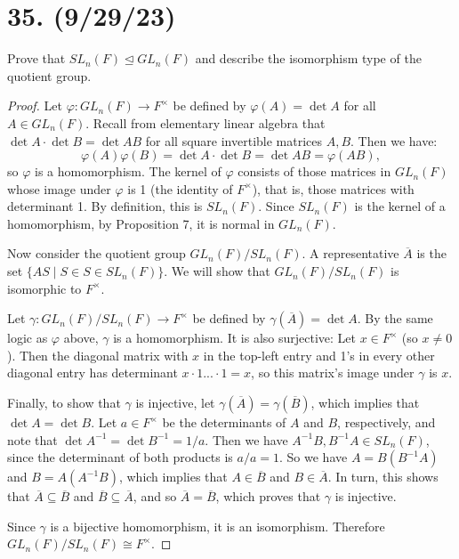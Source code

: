 \documentclass{article}
\begin{document}
\section*{35. (9/29/23)}

Prove that $SL_n(F) \unlhd GL_n(F)$ and describe the isomorphism type of the quotient group.

\begin{proof}
    Let $\varphi: GL_n(F) \rightarrow F^\times$ be defined by $\varphi(A) = \det A$ for all $A \in GL_n(F)$. Recall from elementary linear algebra that $\det A \cdot \det B = \det AB$ for all square invertible matrices $A, B$. Then we have:
    \begin{equation*}
        \varphi(A)\varphi(B) = \det A \cdot \det B = \det AB = \varphi(AB),
    \end{equation*}
    so $\varphi$ is a homomorphism. The kernel of $\varphi$ consists of those matrices in $GL_n(F)$ whose image under $\varphi$ is 1 (the identity of $F^\times$), that is, those matrices with determinant 1. By definition, this is $SL_n(F)$. Since $SL_n(F)$ is the kernel of a homomorphism, by Proposition 7, it is normal in $GL_n(F)$.

    Now consider the quotient group $GL_n(F) / SL_n(F)$. A representative $\overline{A}$ is the set $\{ AS \mid S \in S \in SL_n(F) \}$. We will show that $GL_n(F) / SL_n(F)$ is isomorphic to $F^\times$.

    Let $\gamma: GL_n(F) / SL_n(F) \rightarrow F^\times$ be defined by $\gamma(\overline{A}) = \det A$. By the same logic as $\varphi$ above, $\gamma$ is a homomorphism. It is also surjective: Let $x \in F^\times$ (so $x \neq 0$). Then the diagonal matrix with $x$ in the top-left entry and 1's in every other diagonal entry has determinant $x \cdot 1 ... \cdot 1 = x$, so this matrix's image under $\gamma$ is $x$.

    Finally, to show that $\gamma$ is injective, let $\gamma(\overline{A}) = \gamma(\overline{B})$, which implies that $\det A = \det B$. Let $a \in F^\times$ be the determinants of $A$ and $B$, respectively, and note that $\det A^{-1} = \det B^{-1} = 1/a$. Then we have $A^{-1}B, B^{-1}A \in SL_n(F)$, since the determinant of both products is $a/a = 1$. So we have $A = B(B^{-1}A)$ and $B = A(A^{-1}B)$, which implies that $A \in \overline{B}$ and $B \in \overline{A}$. In turn, this shows that $\overline{A} \subseteq \overline{B}$ and $\overline{B} \subseteq \overline{A}$, and so $\overline{A} = \overline{B}$, which proves that $\gamma$ is injective.

    Since $\gamma$ is a bijective homomorphism, it is an isomorphism. Therefore $GL_n(F) / SL_n(F) \cong F^\times$.
\end{proof}
\end{document}
